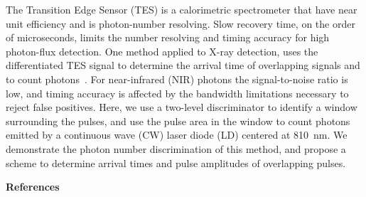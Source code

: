 \documentclass[portrait,a0,final]{a0poster}
\newenvironment{poster}{
  \begin{center}
  \begin{minipage}[c]{0.98\textwidth}
}{
  \end{minipage}
  \end{center}
}
\begin{document}
\begin{poster}
\vspace{0.2cm}



\begin{center}
\end{center}
    The Transition Edge Sensor (TES) is a calorimetric spectrometer that have near unit efficiency and is photon-number resolving.
    Slow recovery time, on the order of microseconds, limits the number resolving and timing accuracy for high photon-flux detection.
    One method applied to X-ray detection, uses the differentiated TES signal to determine the arrival time of overlapping signals and to count photons~\cite{Fowler:2015ef}.
    For near-infrared (NIR) photons the signal-to-noise ratio is low, and timing accuracy is affected by the bandwidth limitations necessary to reject false positives.
    Here, we use a two-level discriminator to identify a window surrounding the pulses, 
    and use the pulse area in the window to count photons
    emitted by a continuous wave (CW) laser diode (LD) 
    centered at 810~nm.
    We demonstrate 
    the photon number discrimination of this method,
    and propose a scheme to determine arrival times and pulse amplitudes of overlapping pulses.

\begin{multicols}{2}
\setlength{\parskip}{0ex}
% 
\columnbreak


% 
% 
% 
\end{multicols}

\begin{center}{\bf \large \textsf {References}}\end{center}


\end{poster}
\end{document}
